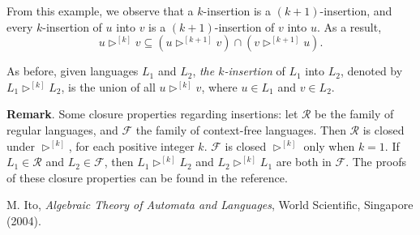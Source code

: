 \documentclass[12pt]{article}
\begin{document}
From this example, we observe that a $k$-insertion is a $(k+1)$-insertion, and every $k$-insertion of $u$ into $v$ is a $(k+1)$-insertion of $v$ into $u$.  As a result, $$u \rhd^{[k]} v \subseteq (u \rhd^{[k+1]} v) \cap (v \rhd^{[k+1]} u).$$

As before, given languages $L_1$ and $L_2$, \emph{the $k$-insertion} of $L_1$ into $L_2$, denoted by $L_1 \rhd^{[k]} L_2$, is the union of all $u \rhd^{[k]} v$, where $u\in L_1$ and $v\in L_2$.

\textbf{Remark}.  Some closure properties regarding insertions: let $\mathscr{R}$ be the family of regular languages, and $\mathscr{F}$ the family of context-free languages.  Then $\mathscr{R}$ is closed under $\rhd^{[k]}$, for each positive integer $k$.  $\mathscr{F}$ is closed $\rhd^{[k]}$ only when $k=1$.  If $L_1\in \mathscr{R}$ and $L_2\in \mathscr{F}$, then $L_1 \rhd^{[k]} L_2$ and $L_2 \rhd^{[k]} L_1$ are both in $\mathscr{F}$.  The proofs of these closure properties can be found in the reference.

\begin{thebibliography}{9}
 M. Ito, {\em Algebraic Theory of Automata and Languages}, World Scientific, Singapore (2004).
\end{thebibliography}
\end{document}
